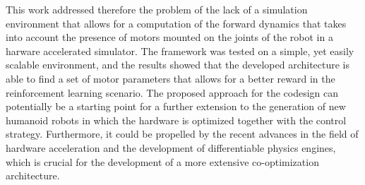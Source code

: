 This work addressed therefore the problem of the lack of a simulation environment that allows for a computation of the forward dynamics that takes into account the presence of motors mounted on the joints of the robot in a harware accelerated simulator. The framework was tested on a simple, yet easily scalable environment, and the results showed that the developed architecture is able to find a set of motor parameters that allows for a better reward in the reinforcement learning scenario.
The proposed approach for the codesign can potentially be a starting point for a further extension to the generation of new humanoid robots in which the hardware is optimized together with the control strategy. Furthermore, it could be propelled by the recent advances in the field of hardware acceleration and the development of differentiable physics engines, which is crucial for the development of a more extensive co-optimization architecture.
